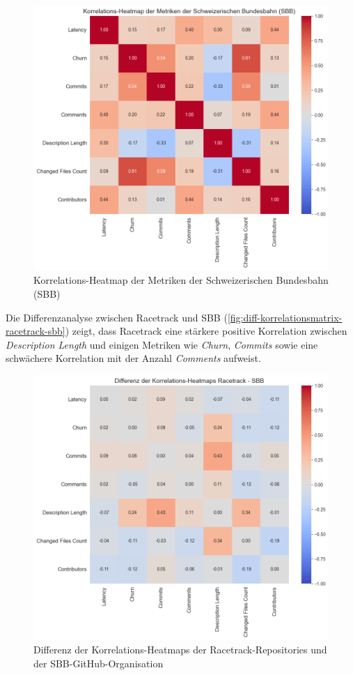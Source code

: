 \begin{figure}[htbp]
    \includegraphics[width=\textwidth]{Figures/sbb-korrelationsmatrix.png}
    \caption{Korrelations-Heatmap der Metriken der Schweizerischen Bundesbahn (SBB)}
    \label{fig:korrelationsmatrix-sbb}
\end{figure}

\newpage
Die Differenzanalyse zwischen Racetrack und SBB (\autoref{fig:diff-korrelationsmatrix-racetrack-sbb}) zeigt, dass Racetrack eine stärkere positive Korrelation zwischen \textit{Description Length} und einigen Metriken wie \textit{Churn}, \textit{Commits} sowie eine schwächere Korrelation mit der Anzahl \textit{Comments} aufweist.

\begin{figure}[htbp]
\includegraphics[width=\textwidth]{Figures/diff-korrelationsmatrix-racetrack-sbb.png}
\caption{Differenz der Korrelations-Heatmaps der Racetrack-Repositories und der SBB-GitHub-Organisation}
\label{fig:diff-korrelationsmatrix-racetrack-sbb}
\end{figure}

